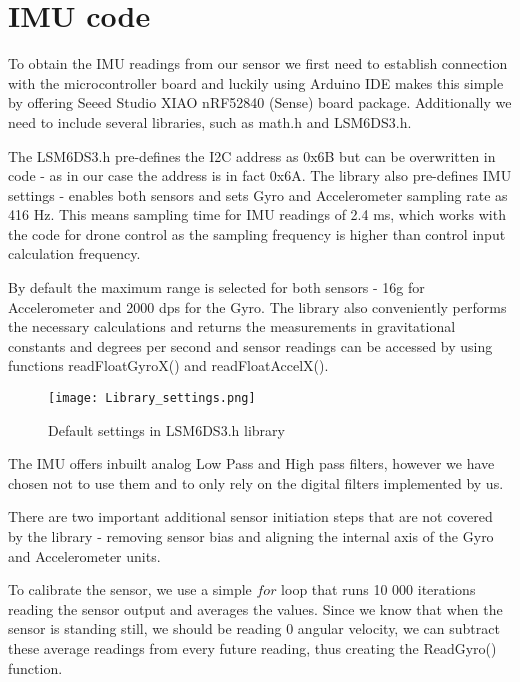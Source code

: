 \documentclass{article}
\begin{document}
\section{IMU code}

\begin{flushleft}
To obtain the IMU readings from our sensor we first need to establish connection with the microcontroller board and luckily using Arduino IDE makes this simple by offering Seeed Studio XIAO nRF52840 (Sense) board package. Additionally we need to include several libraries, such as math.h and LSM6DS3.h. 

The LSM6DS3.h pre-defines the I2C address as 0x6B but can be overwritten in code - as in our case the address is in fact 0x6A. 
The library also pre-defines IMU settings - enables both sensors and sets Gyro and Accelerometer sampling rate as 416 Hz. This means sampling time for IMU readings of 2.4 ms, which works with the code for drone control as the sampling frequency is higher than control input calculation frequency. 

By default the maximum range is selected for both sensors - 16g for Accelerometer and 2000 dps for the Gyro. The library also conveniently performs the necessary calculations and returns the measurements in gravitational constants and degrees per second and sensor readings can be accessed by using functions readFloatGyroX() and readFloatAccelX().  

\begin{figure}[H]
    \begin{center}
    \texttt{[image: Library\_settings.png]}
    \end{center}
    \caption{Default settings in LSM6DS3.h library}
    \label{fig:my_label}
\end{figure}

\begin{flushleft}
The IMU offers inbuilt analog Low Pass and High pass filters, however we have chosen not to use them and to only rely on the digital filters implemented by us.

There are two important additional sensor initiation steps that are not covered by the library - removing sensor bias and aligning the internal axis of the Gyro and Accelerometer units. 

To calibrate the sensor, we use a simple $for$ loop that runs 10 000 iterations reading the sensor output and averages the values. Since we know that when the sensor is standing still, we should be reading 0 angular velocity, we can subtract these average readings from every future reading, thus creating the ReadGyro() function. 
\end{flushleft}


\end{flushleft}
\end{document}
